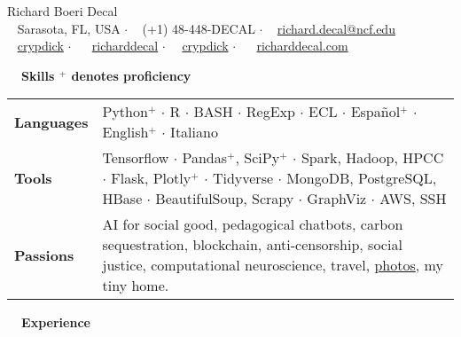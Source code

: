 \documentclass[a4paper,12pt]{article}
\newcommand{\resheading}[1]{{\vspace*{.001in} \colorbox{mygrey}{\begin{minipage}{\textwidth}{\textmd{\large \textbf{#1} \vphantom{p\^{E}}}}\end{minipage}}} }
\newcommand{\ressubheading}[4]{
        \textbf{#1} \hfill #2\\
        \textit{#3} \hfill #4 \\}
\begin{document}
\begin{center}
{\Huge Richard Boeri Decal} \\
{\small \faMapMarker~ Sarasota, FL, USA $\cdot$ \faPhone~ (+1) 48-448-DECAL $\cdot$ \faEnvelope~ \href{mailto:richard.decal@ncf.edu}{richard.decal@ncf.edu}  \\ \faGithubAlt~ \href{https://github.com/crypdick}{crypdick}   $\cdot$ ~\faLinkedin~ \href{https://www.linkedin.com/in/richarddecal/}{richarddecal}  $\cdot$~\faStackOverflow~  \href{https://stackoverflow.com/users/4212158/crypdick}{crypdick} $\cdot$  ~\faHome~  \href{http://www.richarddecal.com}{richarddecal.com}}
\end{center}

\resheading{~~Skills \hfill {\small$^+$ denotes proficiency}}
\vspace{-1em}
\begin{tabularx}{\textwidth}{p{2.1cm}>{\arraybackslash}X}
  \bfseries{Languages} & Python$^+$ $\cdot$ R  $\cdot$ BASH $\cdot$ RegExp $\cdot$ ECL $\cdot$ Espa\~nol$^+$ $\cdot$ English$^+$ $\cdot$ Italiano \\  %
  \bfseries{Tools} & Tensorflow  $\cdot$ Pandas$^+$, SciPy$^+$ $\cdot$ Spark, Hadoop, HPCC $\cdot$ Flask, Plotly$^+$ $\cdot$ Tidyverse $\cdot$ \mbox{MongoDB}, PostgreSQL, HBase $\cdot$ BeautifulSoup, Scrapy $\cdot$ GraphViz $\cdot$ AWS, SSH\\
  \bfseries{Passions} & AI for social good, pedagogical chatbots, carbon sequestration, blockchain, anti-censorship, social justice, computational neuroscience, travel, \href{https://www.flickr.com/photos/richarddecal/sets/72157640025469005/}{photos}, my tiny home.
\end{tabularx}


\resheading{~~Experience}
\vspace{-1em}
\end{document}
